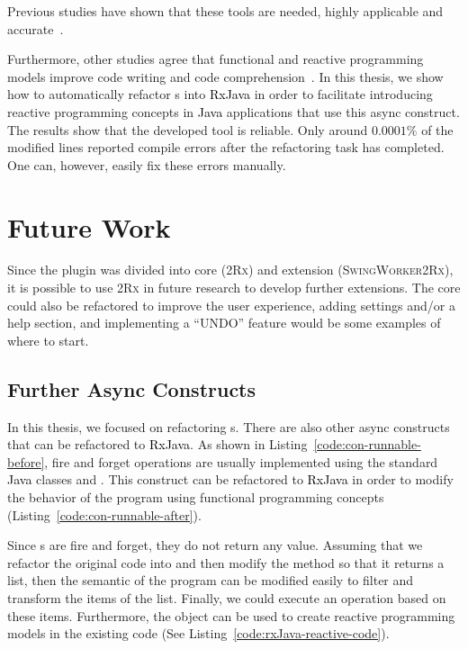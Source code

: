 \documentclass[type=bsc,accentcolor=tud9c]{tudthesis}
\newcommand{\framework}[1]{\textcolor{black}{#1}}
\newcommand{\toolcore}{\textsc{2Rx}}
\newcommand{\toolextension}{\textsc{SwingWorker2Rx}}
\begin{document}
Previous studies have shown that these tools are needed, highly applicable and accurate~\cite{paperAsyncMobile, paperStudyRefactoring, thesisJavaScript}.

Furthermore, other studies agree that functional and reactive programming models improve code writing and code comprehension~\cite{promises, paperReactiveComprehension}. In this thesis, we show how to automatically refactor s into \framework{RxJava} in order to facilitate introducing reactive programming concepts in \framework{Java} applications that use this async construct. The results show that the developed tool is reliable. Only around $0.0001\%$ of the modified lines reported compile errors after the refactoring task has completed. One can, however, easily fix these errors manually.

\section{Future Work}

Since the plugin was divided into core (\toolcore{}) and extension (\toolextension{}), it is possible to use \toolcore{} in future research to develop further extensions. The core could also be refactored to improve the user experience, adding settings and/or a help section, and implementing a ``UNDO'' feature would be some examples of where to start.

\subsection{Further Async Constructs}
In this thesis, we focused on refactoring s. There are also other async constructs that can be refactored to \framework{RxJava}. As shown in Listing~\ref{code:con-runnable-before}, fire and forget operations are usually implemented using the standard \framework{Java} classes  and . This construct can be refactored to \framework{RxJava} in order to modify the behavior of the program using functional programming concepts (Listing~\ref{code:con-runnable-after}).

Since s are fire and forget, they do not return any value. Assuming that we refactor the original code into  and then modify the method  so that it returns a list, then the semantic of the program can be modified easily to filter and transform the items of the list. Finally, we could execute an operation based on these items. Furthermore, the  object can be used to create reactive programming models in the existing code (See Listing~\ref{code:rxJava-reactive-code}).
\end{document}
